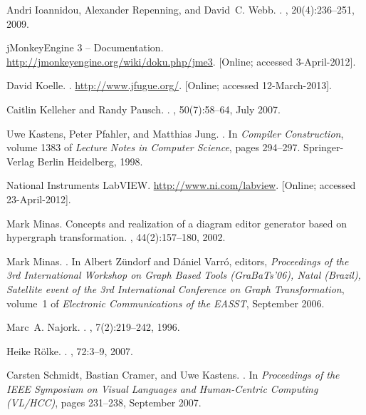 \documentclass[a4paper]{article}
\begin{document}
\begin{thebibliography}{GMR98}
Andri Ioannidou, Alexander Repenning, and David~C. Webb.
.
, 20(4):236--251,
  2009.

{jMonkeyEngine 3 -- Documentation}.
\newblock \url{http://jmonkeyengine.org/wiki/doku.php/jme3}. [Online; accessed
  3-April-2012].

David Koelle.
.
\newblock \url{http://www.jfugue.org/}. [Online; accessed 12-March-2013].

Caitlin Kelleher and Randy Pausch.
.
, 50(7):58--64, July 2007.

Uwe Kastens, Peter Pfahler, and Matthias Jung.
.
\newblock In {\em Compiler Construction}, volume 1383 of {\em Lecture Notes in
  Computer Science}, pages 294--297. Springer-Verlag Berlin Heidelberg, 1998.

{National Instruments LabVIEW}.
\newblock \url{http://www.ni.com/labview}. [Online; accessed 23-April-2012].

Mark Minas.
\newblock Concepts and realization of a diagram editor generator based on
  hypergraph transformation.
, 44(2):157--180, 2002.

Mark Minas.
.
\newblock In Albert Z{\"u}ndorf and D{\'a}niel Varr{\'o}, editors, {\em
  Proceedings of the 3rd International Workshop on Graph Based Tools
  (GraBaTs'06), Natal (Brazil), Satellite event of the 3rd International
  Conference on Graph Transformation}, volume~1 of {\em Electronic
  Communications of the EASST}, September 2006.

Marc~A. Najork.
.
, 7(2):219--242, 1996.

Heike R\"{o}lke.
.
, 72:3--9, 2007.

Carsten Schmidt, Bastian Cramer, and Uwe Kastens.
.
\newblock In {\em Proceedings of the IEEE Symposium on Visual Languages and
  Human-Centric Computing (VL/HCC)}, pages 231--238, September 2007.


\end{thebibliography}
\end{document}
